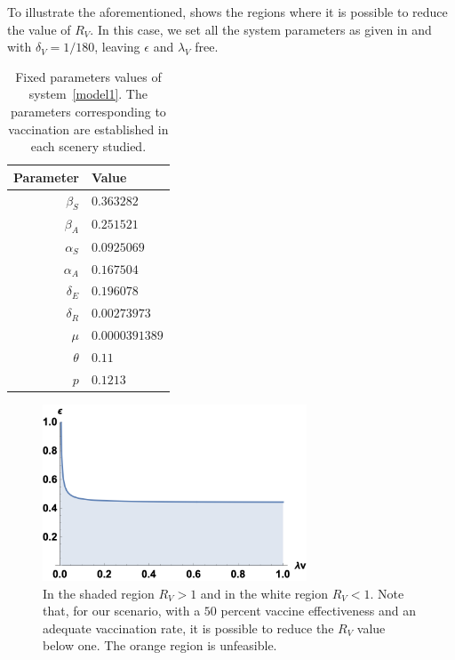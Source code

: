 To illustrate the aforementioned,  shows the regions
where it is possible to reduce the value of $ R_V $. In this case,
we set all the system parameters as given in
 and with $ \delta_V = 1/180 $, leaving
$ \epsilon $ and $ \lambda_V $ free.
%
\begin{table}[h!]
    \begin{center}
        \begin{tabular}{rl}
            \toprule
            Parameter & Value
            \\
            \midrule
            $\beta_S$ & $0.363282$
            \\
            $\beta_A$ & $0.251521$
            \\
            $\alpha_{S}$  & $0.0925069$
            \\
            $\alpha_{A}$ & $0.167504$
            \\
            $\delta_{E}$ & $0.196078$
            \\
            $\delta_{R}$ & $0.00273973$
            \\
            $\mu$        & $0.0000391389 $
            \\
            $\theta$        & $0.11 $
            \\
            $p$        & $0.1213 $
            \\
            \bottomrule
        \end{tabular}
        \caption{Fixed parameters values of system~\eqref{model1}.
        The
        parameters corresponding to vaccination are established in
        each scenery
        studied.}
        \label{tbl:fixed_parameters}
    \end{center}
\end{table}
%
\begin{figure}[!h]
    \centering
    \includegraphics[width=0.7\textwidth]{R0-2D.png}
    \caption{
        In the shaded region $ R_V> 1 $ and in the white
        region $ R_V <1$. Note that, for our scenario, with a $50$
        percent vaccine effectiveness and an adequate vaccination rate,
        it is possible to reduce the $ R_V $ value below one. The orange region
        is unfeasible.
    }
    \label{R0-2D}
\end{figure}
